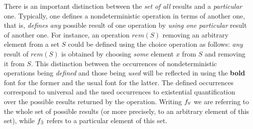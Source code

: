 There is an important distinction between the {\em set of all} results and a {\em particular} one. Typically, one defines a nondeterministic operation in terms of another one, that is, {\em defines any} possible result of
one operation by {\em using one particular} result of another one. For instance, an operation $rem(S)$ removing an arbitrary element from a set $S$ could be
defined using the choice operation as follows: {\em any} result of $rem(S)$ is
obtained by choosing {\em some} element $x$ from $S$ and removing it from $S$.
This distinction between the occurrences of nondeterministic operations being {\em defined} and those being {\em used} will be reflected in using the {\bf bold} font for the former and the usual font for the
latter. The defined occurrences correspond to universal and the used occurrences to existential quantification over the possible results returned by
the operation. Writing $f_\forall$ we are referring to the whole set of possible results (or more precisely, to an arbitrary element of this set), while $f_\exists$ refers to a particular element of this set. 

